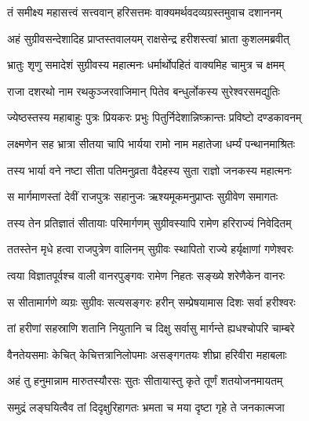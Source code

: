 
\textlink{}
\translink{}

\storymeta

\twolineshloka
{तं समीक्ष्य महासत्त्वं सत्त्ववान् हरिसत्तमः}
{वाक्यमर्थवदव्यग्रस्तमुवाच दशाननम्}

\twolineshloka
{अहं सुग्रीवसन्देशादिह प्राप्तस्तवालयम्}
{राक्षसेन्द्र हरीशस्त्वां भ्राता कुशलमब्रवीत्}

\twolineshloka
{भ्रातुः शृणु समादेशं सुग्रीवस्य महात्मनः}
{धर्मार्थोपहितं वाक्यमिह चामुत्र च क्षमम्}

\twolineshloka
{राजा दशरथो नाम रथकुञ्जरवाजिमान्}
{पितेव बन्धुर्लोकस्य सुरेश्वरसमद्युतिः}

\twolineshloka
{ज्येष्ठस्तस्य महाबाहुः पुत्रः प्रियकरः प्रभुः}
{पितुर्निदेशान्निष्क्रान्तः प्रविष्टो दण्डकावनम्}

\twolineshloka
{लक्ष्मणेन सह भ्रात्रा सीतया चापि भार्यया}
{रामो नाम महातेजा धर्म्यं पन्थानमाश्रितः}

\twolineshloka
{तस्य भार्या वने नष्टा सीता पतिमनुव्रता}
{वैदेहस्य सुता राज्ञो जनकस्य महात्मनः} 

\twolineshloka
{स मार्गमाणस्तां देवीं राजपुत्रः सहानुजः}
{ऋश्यमूकमनुप्राप्तः सुग्रीवेण समागतः}

\twolineshloka
{तस्य तेन प्रतिज्ञातं सीतायाः परिमार्गणम्}
{सुग्रीवस्यापि रामेण हरिराज्यं निवेदितम्}

\twolineshloka
{ततस्तेन मृधे हत्वा राजपुत्रेण वालिनम्}
{सुग्रीवः स्थापितो राज्ये हर्यृक्षाणां गणेश्वरः}

\twolineshloka
{त्वया विज्ञातपूर्वश्च वाली वानरपुङ्गवः}
{रामेण निहतः सङ्ख्ये शरेणैकेन वानरः}

\twolineshloka
{स सीतामार्गणे व्यग्रः सुग्रीवः सत्यसङ्गरः}
{हरीन् सम्प्रेषयामास दिशः सर्वा हरीश्वरः}

\twolineshloka
{तां हरीणां सहस्राणि शतानि नियुतानि च}
{दिक्षु सर्वासु मार्गन्ते ह्यधश्चोपरि चाम्बरे}

\twolineshloka
{वैनतेयसमाः केचित् केचित्तत्रानिलोपमाः}
{असङ्गगतयः शीघ्रा हरिवीरा महाबलाः}

\twolineshloka
{अहं तु हनुमान्नाम मारुतस्यौरसः सुतः}
{सीतायास्तु कृते तूर्णं शतयोजनमायतम्}

\twolineshloka
{समुद्रं लङ्घयित्वैव तां दिदृक्षुरिहागतः}
{भ्रमता च मया दृष्टा गृहे ते जनकात्मजा}

